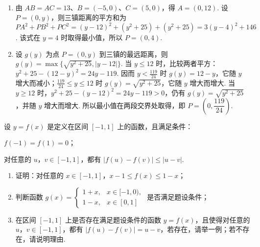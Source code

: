 \begin{solution}
\begin{enumerate}
\item 由 \(AB=AC=13\)、\(B=(-5,0)\)、\(C=(5,0)\)，得 \(A=(0,12)\). 设 \(P=(0,y)\)，则三镇距离的平方和为 \(PA^2+PB^2+PC^2=(y-12)^2+(y^2+25)+(y^2+25)=3(y-4)^2+146\). 该式在 \(y=4\) 时取得最小值，所以 \(P=(0,4)\).
\item 设 \(g(y)\) 为点 \(P=(0,y)\) 到三镇的最远距离，则 \(g(y)=\max\{\sqrt{y^2+25},|y-12|\}\). 当 \(y\leqslant12\) 时，比较两者平方：\(y^2+25-(12-y)^2=24y-119\). 因而 \(y<\frac{119}{24}\) 时 \(g(y)=12-y\)，它随 \(y\) 增大而减小；\(\frac{119}{24}\leqslant y\leqslant12\) 时 \(g(y)=\sqrt{y^2+25}\)，它随 \(y\) 增大而增大. 当 \(y\geqslant12\) 时，\(y^2+25-(y-12)^2=24y-119>0\)，仍有 \(g(y)=\sqrt{y^2+25}\)，并随 \(y\) 增大而增大. 所以最小值在两段交界处取得，即 \(P=\left(0,\dfrac{119}{24}\right)\).
\end{enumerate}
\end{solution}

\begin{problem}
设 \(y = f(x)\) 是定义在区间 \([-1,1]\) 上的函数，且满足条件：

\begin{circlelist}
\item \(f(-1) = f(1) = 0\)；
\item 对任意的 \(u\)，\(v \in [-1,1]\)，都有 \(\left|f(u) - f(v)\right| \leqslant |u - v|\).
\end{circlelist}

\begin{enumerate}
\item 证明：对任意的 \(x \in [-1,1]\)，\(x - 1 \leqslant f(x) \leqslant 1 - x\)；
\item 判断函数 \(g(x) = \begin{cases}
1 + x,& x \in [-1,0),\\
1 - x,& x \in [0,1]
\end{cases}\) 是否满足题设条件；
\item 在区间 \([-1,1]\) 上是否存在满足题设条件的函数 \(y = f(x)\)，且使得对任意的 \(u\)，\(v \in [-1,1]\)，都有 \(\left|f(u) - f(v)\right| = u - v\)，若存在，请举一例；若不存在，请说明理由.
\end{enumerate}
\end{problem}

